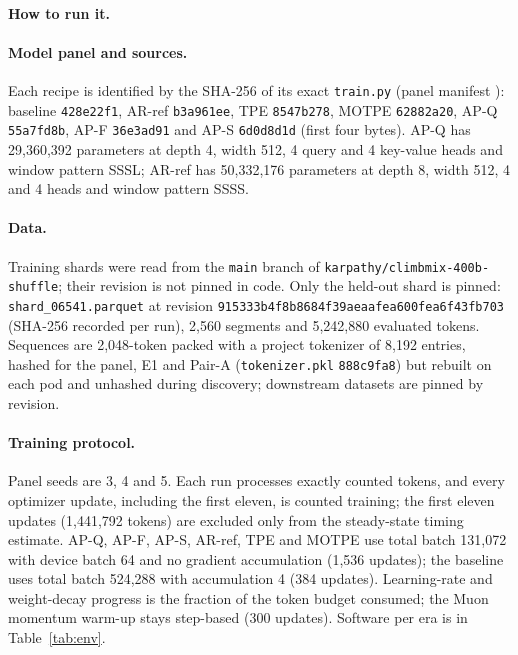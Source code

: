 \documentclass{article}
\begin{document}
\paragraph{How to run it.}\label{app:howto} 

\paragraph{Model panel and sources.} Each recipe is identified by the SHA-256 of its exact \texttt{train.py} (panel manifest ): baseline \texttt{428e22f1}, AR-ref \texttt{b3a961ee}, TPE \texttt{8547b278}, MOTPE \texttt{62882a20}, AP-Q \texttt{55a7fd8b}, AP-F \texttt{36e3ad91} and AP-S \texttt{6d0d8d1d} (first four bytes). AP-Q has 29,360,392 parameters at depth 4, width 512, 4 query and 4 key-value heads and window pattern SSSL; AR-ref has 50,332,176 parameters at depth 8, width 512, 4 and 4 heads and window pattern SSSS.

\paragraph{Data.} Training shards were read from the \texttt{main} branch of \texttt{karpathy/climbmix-400b-shuffle}; their revision is not pinned in code. Only the held-out shard is pinned: \texttt{shard\_06541.parquet} at revision \texttt{915333b4f8b8684f39aeaafea600fea6f43fb703} (SHA-256 recorded per run), 2,560 segments and 5,242,880 evaluated tokens. Sequences are 2,048-token packed with a project tokenizer of 8,192 entries, hashed for the panel, E1 and Pair-A (\texttt{tokenizer.pkl} \texttt{888c9fa8}) but rebuilt on each pod and unhashed during discovery; downstream datasets are pinned by revision.

\paragraph{Training protocol.} Panel seeds are 3, 4 and 5. Each run processes exactly \CRPanelBudget{} counted tokens, and every optimizer update, including the first eleven, is counted training; the first eleven updates (1,441,792 tokens) are excluded only from the steady-state timing estimate. AP-Q, AP-F, AP-S, AR-ref, TPE and MOTPE use total batch 131,072 with device batch 64 and no gradient accumulation (1,536 updates); the baseline uses total batch 524,288 with accumulation 4 (384 updates). Learning-rate and weight-decay progress is the fraction of the token budget consumed; the Muon \citep{jordan2024muon} momentum warm-up stays step-based (300 updates). Software per era is in Table~\ref{tab:env}.
\end{document}
